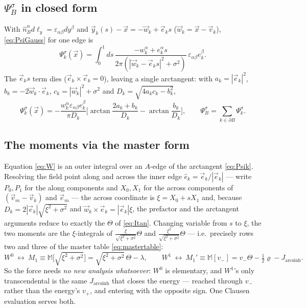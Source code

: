 \documentclass[11pt]{article}
\numberwithin{equation}{section}
\newcommand{\vv}[1]{\vec{#1}}
\newcommand{\eps}{\varepsilon}
\newcommand{\half}{\tfrac{1}{2}}
\DeclareMathOperator{\arcsinh}{arcsinh}
\begin{document}
\subsection{\texorpdfstring{$\Psi_B^\sigma$}{Psi\_B} in closed form}
With $\hat n_B^\alpha d\ell_y=\eps_{\alpha\beta}dy^\beta$ and $\vv y_k(s)-\vv x=-\vv w_k+\vv e_k s$
($\vv w_k=\vv x-\vv v_k$), \eqref{eq:PsiGauss} for one edge is
\[
  \Psi_k^\sigma(\vv x)=\int_0^1\!ds\,
  \frac{-w_k^\alpha+e_k^\alpha s}{2\pi(|\vv w_k-\vv e_k s|^2+\sigma^2)}\,\eps_{\alpha\beta}e_k^\beta .
\]
The $\vv e_k s$ term dies ($\vv e_k\!\times\!\vv e_k=0$), leaving a single arctangent: with
$a_k=|\vv e_k|^2$, $b_k=-2\vv w_k\!\cdot\!\vv e_k$, $c_k=|\vv w_k|^2+\sigma^2$ and
$D_k=\sqrt{4a_kc_k-b_k^2}$,
\begin{equation}\label{eq:Psik}
  \Psi_k^\sigma(\vv x)=-\frac{w_k^\alpha\eps_{\alpha\beta}e_k^\beta}{\pi D_k}
  \Big[\arctan\frac{2a_k+b_k}{D_k}-\arctan\frac{b_k}{D_k}\Big],\qquad
  \Psi_B^\sigma=\sum_{k\in\partial B}\Psi_k^\sigma .
\end{equation}

\subsection{The moments via the master form}
Equation \eqref{eq:W} is an outer integral over an $A$-edge of the arctangent \eqref{eq:Psik}. Resolving
the field point along and across the inner edge $\hat e_k=\vv e_k/|\vv e_k|$ --- write $P_0,P_1$ for the
along components and $X_0,X_1$ for the across components of $(\vv v_m-\vv v_k)$ and $\vv e_m$ --- the
across coordinate is $\xi=X_0+sX_1$ and, because $D_k=2|\vv e_k|\sqrt{\xi^2+\sigma^2}$ and
$\vv w_k\!\times\!\vv e_k=|\vv e_k|\xi$, the prefactor and the arctangent arguments reduce to exactly
the $\Theta$ of \eqref{eq:Itan}. Changing variable from $s$ to $\xi$, the two moments are the
$\xi$-integrals of $\frac{\xi}{\sqrt{\xi^2+\sigma^2}}\Theta$ and
$\frac{\xi^2}{\sqrt{\xi^2+\sigma^2}}\Theta$ --- i.e.\ precisely rows two and three of the master table
\eqref{eq:mastertable}:
\begin{equation}\label{eq:WM}
  W^{0}\ \longleftrightarrow\ M_1\equiv\mathbb M\big[\sqrt{\xi^2+\sigma^2}\big]
  =\sqrt{\xi^2+\sigma^2}\,\Theta-\lambda,
  \qquad
  W^{1}\ \longleftrightarrow\ M_1'\equiv\mathbb M[v_-]=v_-\Theta-\half\varrho-J_{\arcsinh}.
\end{equation}
So the force needs \emph{no new analysis whatsoever}: $W^0$ is elementary, and $W^1$'s only
transcendental is the same $J_{\arcsinh}$ that closes the energy --- reached through $v_-$ rather than
the energy's $v_+$, and entering with the opposite sign. One Clausen evaluation serves both.
\end{document}
